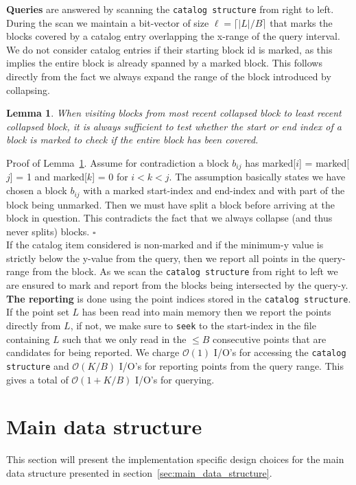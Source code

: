 \documentclass[twoside,11pt,openright]{report}
\newtheorem{lemma}{Lemma}
\begin{document}
\textbf{Queries} are answered by scanning the \texttt{catalog structure} from right to left. During the scan we maintain a bit-vector of size $\ell = \lceil\lvert L \lvert / B\rceil$ that marks the blocks covered by a catalog entry overlapping the x-range of the query interval. We do not consider catalog entries if their starting block id is marked, as this implies the entire block is already spanned by a marked block. This follows directly from the fact we always expand the range of the block introduced by collapsing. 

\begin{lemma}
\label{lma:no_splits}
When visiting blocks from most recent collapsed block to least recent collapsed block, it is always sufficient to test whether the start or end index of a block is marked to check if the entire block has been covered.
\end{lemma}

Proof of Lemma~\ref{lma:no_splits}. Assume for contradiction a block $b_{ij}$ has marked[$i$] = marked[$j$] = 1 and marked[$k$] = 0 for  $i < k < j$. The assumption basically states we have chosen a block $b_{ij}$ with a marked start-index and end-index and with part of the block being unmarked. Then we must have split a block before arriving at the block in question. This contradicts the fact that we always collapse (and thus never splits) blocks. $\square$ \\

If the catalog item considered is non-marked and if the minimum-y value is strictly below the y-value from the query, then we report all points in the query-range from the block. As we scan the \texttt{catalog structure} from right to left we are ensured to mark and report from the blocks being intersected by the query-y. \\

\textbf{The reporting} is done using the point indices stored in the \texttt{catalog structure}. If the point set $L$ has been read into main memory then we report the points directly from $L$, if not, we make sure to \texttt{seek} to the start-index in the file containing $L$ such that we only read in the $\leq B$ consecutive points that are candidates for being reported.
We charge $\mathcal{O}(1)$ I/O's for accessing the \texttt{catalog structure} and $\mathcal{O}(K/B)$ I/O's for reporting points from the query range. This gives a total of  $\mathcal{O}(1+K/B)$ I/O's for querying.

\section{Main data structure}
\label{sec:impl_main_data_structure}
This section will present the implementation specific design choices for the main data structure presented in section~\ref{sec:main_data_structure}. \\
\end{document}
